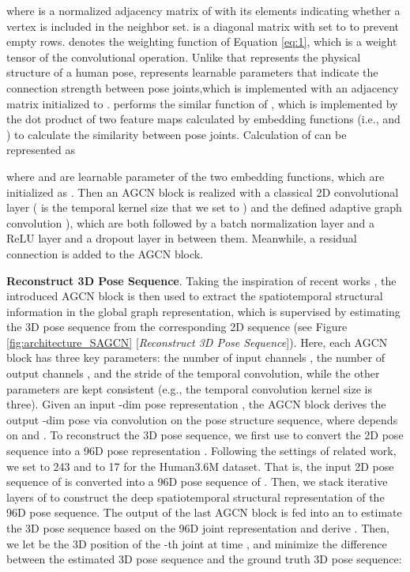 \documentclass[10pt,twocolumn,letterpaper]{article}
\begin{document}
where  is a normalized adjacency matrix of  with its elements indicating whether a vertex  is included in the neighbor set.  is a diagonal matrix with  set to  to prevent empty rows.  denotes the weighting function of Equation \ref{eq:1}, which is a weight tensor of the  convolutional operation. Unlike  that represents the physical structure of a human pose,  represents learnable parameters that indicate the connection strength between pose joints,which is implemented with an  adjacency matrix initialized to .  performs the similar function of , which is implemented by the dot product of two feature maps calculated by embedding functions (i.e.,  and ) to calculate the similarity between pose joints. Calculation of  can be represented as 

where  and  are learnable parameter of the two embedding functions, which are initialized as . Then an AGCN block is realized with a  classical 2D convolutional layer ( is the temporal kernel size that we set to ) and the defined adaptive graph convolution ), which are both followed by a batch normalization layer and a ReLU layer and a dropout layer in between them. Meanwhile, a residual connection \cite{he2016deep} is added to the AGCN block. 

\noindent \textbf{Reconstruct 3D Pose Sequence}.
Taking the inspiration of recent works \cite{RN014,hu2021conditional,li2022mhformer,li2022exploiting},  the introduced AGCN block is then used to extract the spatiotemporal structural information in the global graph representation, which is supervised by estimating the 3D pose sequence from the corresponding 2D sequence (see Figure \ref{fig:architecture_SAGCN} [\textit{Reconstruct 3D Pose Sequence}]).
Here, each AGCN block has three key parameters: the number of input channels , the number of output channels , and the stride  of the temporal convolution, while the other parameters are kept consistent (e.g., the temporal convolution kernel size is three). Given an input -dim pose representation  , the AGCN block derives the output -dim pose  via convolution on the pose structure sequence, where  depends on  and . To reconstruct the 3D pose sequence, we first use  to convert the 2D pose sequence  into a 96D pose representation . Following the settings of related work, we set  to 243 and  to 17 for the Human3.6M dataset. That is, the input 2D pose sequence of  is converted into a 96D pose sequence of . Then, we stack iterative layers of  to construct the deep spatiotemporal structural representation of the 96D pose sequence. The output of the last AGCN block is fed into an  to estimate the 3D pose sequence based on the 96D joint representation and derive . Then, we let  be the 3D position of the -th joint at time , and minimize the difference between the estimated 3D pose sequence and the ground truth 3D pose sequence:
\end{document}
